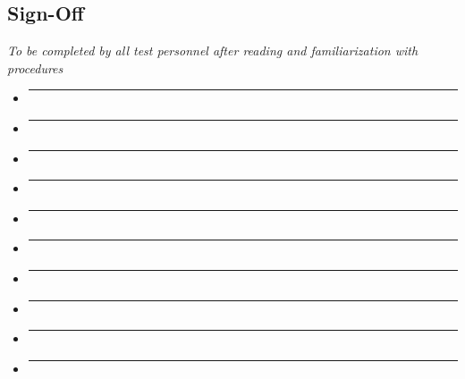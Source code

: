 \newpage
\subsection{Sign-Off}
\textit{To be completed by all test personnel after reading and familiarization with procedures}
\begin{itemize}
    \item \opsfull{}            \tabto{20em}\rule{20em}{0.4pt}
    \item \primaryfull{}        \tabto{20em}\rule{20em}{0.4pt}
    \item \secondaryfull{}      \tabto{20em}\rule{20em}{0.4pt}
    \item \rlcsfull{}           \tabto{20em}\rule{20em}{0.4pt}
    \item \daqfull{}            \tabto{20em}\rule{20em}{0.4pt}
    \item \perifull{}           \tabto{20em}\rule{20em}{0.4pt}
    \item \periifull{}          \tabto{20em}\rule{20em}{0.4pt}
    \item \periiifull{}         \tabto{20em}\rule{20em}{0.4pt}
    \item \perivfull{}          \tabto{20em}\rule{20em}{0.4pt} 
    \item \emergencyfull{}      \tabto{20em}\rule{20em}{0.4pt}
\end{itemize}
\setcounter{checklistnum}{0}

\newpage

